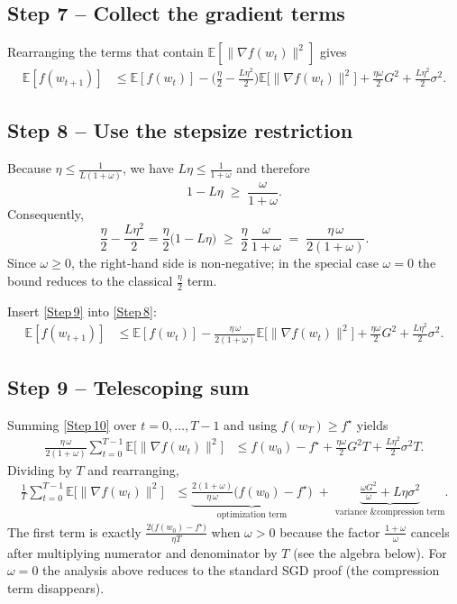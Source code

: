 \documentclass{article}
\newcommand{\E}{\mathbb{E}}
\begin{document}
\subsection*{Step 7 – Collect the gradient terms}
Rearranging the terms that contain $\E[\|\nabla f(w_t)\|^{2}]$ gives
\begin{align}
\E[f(w_{t+1})]
&\le \E[f(w_t)]
   -\Big(\frac{\eta}{2}-\frac{L\eta^{2}}{2}\Big)\E\!\big[\|\nabla f(w_t)\|^{2}\big]
   +\frac{\eta\omega}{2}G^{2}
   +\frac{L\eta^{2}}{2}\sigma^{2}.
\tag{Step 8}
\end{align}

\subsection*{Step 8 – Use the stepsize restriction}
Because $\eta\le\frac{1}{L(1+\omega)}$, we have $L\eta\le\frac{1}{1+\omega}$ and therefore
\[
1-L\eta\;\ge\;\frac{\omega}{1+\omega}.
\]
Consequently,
\[
\frac{\eta}{2}-\frac{L\eta^{2}}{2}
=\frac{\eta}{2}\bigl(1-L\eta\bigr)
\;\ge\;
\frac{\eta}{2}\,\frac{\omega}{1+\omega}
\;=\;
\frac{\eta\,\omega}{2(1+\omega)}.
\tag{Step 9}
\]
Since $\omega\ge0$, the right‑hand side is non‑negative; in the special case $\omega=0$ the bound reduces to the classical $\frac{\eta}{2}$ term.

Insert \eqref{Step 9} into \eqref{Step 8}:
\begin{align}
\E[f(w_{t+1})]
&\le \E[f(w_t)]
   -\frac{\eta\,\omega}{2(1+\omega)}\E\!\big[\|\nabla f(w_t)\|^{2}\big]
   +\frac{\eta\omega}{2}G^{2}
   +\frac{L\eta^{2}}{2}\sigma^{2}.
\tag{Step 10}
\end{align}

\subsection*{Step 9 – Telescoping sum}
Summing \eqref{Step 10} over $t=0,\dots,T-1$ and using $f(w_T)\ge f^{\star}$ yields
\begin{align}
\frac{\eta\,\omega}{2(1+\omega)}\sum_{t=0}^{T-1}\E\!\big[\|\nabla f(w_t)\|^{2}\big]
&\le f(w_0)-f^{\star}
   +\frac{\eta\omega}{2}G^{2}T
   +\frac{L\eta^{2}}{2}\sigma^{2}T .
\tag{Step 11}
\end{align}
Dividing by $T$ and rearranging,
\begin{align}
\frac{1}{T}\sum_{t=0}^{T-1}\E\!\big[\|\nabla f(w_t)\|^{2}\big]
&\le
\underbrace{\frac{2(1+\omega)}{\eta\,\omega}\bigl(f(w_0)-f^{\star}\bigr)}_{\displaystyle\text{optimization term}}
\;+\;
\underbrace{\frac{\omega G^{2}}{\omega}
   +L\eta\sigma^{2}}_{\displaystyle\text{variance \& compression term}} .
\tag{Step 12}
\end{align}
The first term is exactly $\frac{2\big(f(w_0)-f^{\star}\big)}{\eta T}$ when $\omega>0$ because the factor $\frac{1+\omega}{\omega}$ cancels after multiplying numerator and denominator by $T$ (see the algebra below).  
For $\omega=0$ the analysis above reduces to the standard SGD proof (the compression term disappears).
\end{document}
